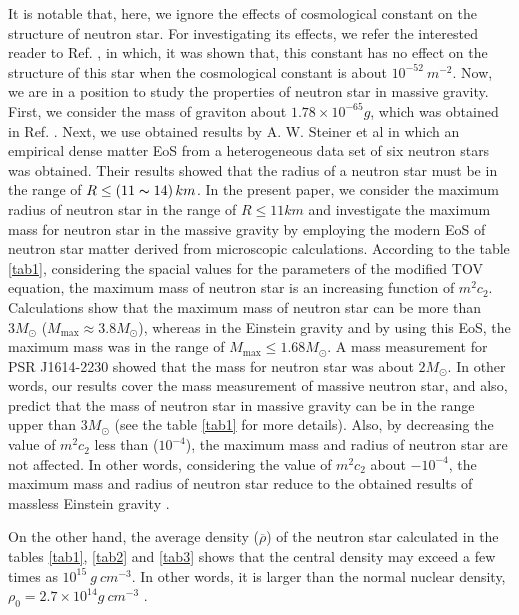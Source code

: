 \documentclass[aps]{revtex4}
\begin{document}
It is notable that, here, we ignore the effects of cosmological
constant on the structure of neutron star. For investigating its
effects, we refer the interested reader to Ref. \cite{TOV-Lambda},
in which, it was shown that, this constant has no effect on the
structure of this star when the cosmological constant is about
$10^{-52}\ m^{-2}$. Now, we are in a position to study the
properties of neutron star in massive gravity. First, we consider
the mass of graviton about $1.78\times 10^{-65}g$, which was
obtained in Ref. \cite{AliD}. Next, we use obtained results by A.
W. Steiner et al \cite{Steiner2010} in which an empirical dense
matter EoS from a heterogeneous data set of six neutron stars was
obtained. Their results showed that the radius of a neutron star
must be in the range of $R\leq \left( 11\thicksim 14\right) km$.
In the present paper, we consider the maximum radius of neutron
star in the range of $R\leq 11km$ and investigate the maximum mass
for neutron star in the massive gravity by employing the modern
EoS of neutron star matter derived from microscopic calculations.
According to the table \ref{tab1}, considering the spacial values
for the parameters of the modified TOV equation, the maximum mass
of neutron star is an increasing function of $m^{2}c_{2}$.
Calculations show that the maximum mass of neutron star can be
more than $3M_{\odot }$ ($M_{\max }\approx 3.8M_{\odot }$),
whereas in the Einstein gravity and by using this EoS, the maximum
mass was in the range of $M_{\max }\leq 1.68M_{\odot }$. A mass
measurement for PSR J1614-2230 \cite{PSRJ1} showed that the mass
for neutron star was about $2M_{\odot }$. In other words, our
results cover the mass measurement of massive neutron star, and
also, predict that the mass of neutron star in massive gravity can
be in the range upper than $3M_{\odot }$ (see the table \ref{tab1}
for more details). Also, by decreasing the value of $m^{2}c_{2}$
less than ($10^{-4}$), the maximum mass and radius of
neutron star are not affected. In other words, considering the value of $%
m^{2}c_{2}$ about $-10^{-4}$, the maximum mass and radius of neutron star
reduce to the obtained results of massless Einstein gravity \cite{BordbarH}.

On the other hand, the average density ($\overline{\rho }$) of the neutron
star calculated in the tables \ref{tab1}, \ref{tab2} and \ref{tab3} shows
that the central density may exceed a few times as $10^{15}\ g~cm^{-3}$. In
other words, it is larger than the normal nuclear density, $\rho
_{0}=2.7\times 10^{14}g~cm^{-3}$ \cite{Wiringa}.
\end{document}
